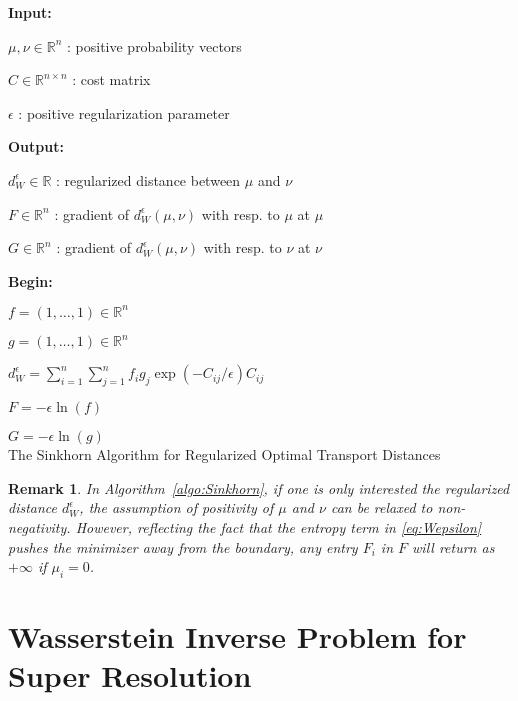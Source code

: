 \documentclass[conference]{IEEEtran}
\newcommand{\R}{{\mathbb{R}}}
\newtheorem*{remark}{Remark}
\begin{document}
\begin{algorithm}
    \textbf{Input:} 
    
    \quad $\mu, \nu \in \R^n$ : positive probability vectors 

    \quad $C\in\R^{n \times n}$ : cost matrix 
    
    \quad $\epsilon$ : positive regularization parameter
    
    \textbf{Output:}
    
    \quad $d_W^\epsilon \in \R$ : regularized distance between $\mu$ and $\nu$
    
    \quad $F \in \R^n$ : gradient of $d_W^\epsilon(\mu,\nu)$ with resp. to $\mu$ at $\mu$
    
    \quad $G \in \R^n$ : gradient of $d_W^\epsilon(\mu,\nu)$ with resp. to $\nu$ at $\nu$ 

    \textbf{Begin:} 

    $f = (1,\ldots,1)\in \R^n$
    
    $g = (1,\ldots,1)\in \R^n$
    
 	{
  	}
  	
    $d_W^\epsilon = \sum_{i=1}^n \sum_{j=1}^n f_i g_j \exp(-C_{ij} /\epsilon) C_{ij}$ 
  	
  	$F = -\epsilon \ln(f)$
  	
  	$G = -\epsilon \ln(g)$\\
  	
	\caption{The Sinkhorn Algorithm for Regularized Optimal Transport Distances}
	\label{algo:Sinkhorn}
\end{algorithm}


\begin{remark}
In Algorithm~\ref{algo:Sinkhorn}, if one is only interested the regularized distance $d_W^\epsilon$, the assumption of positivity of $\mu$ and $\nu$ can be relaxed to non-negativity. 
However, reflecting the fact that the entropy term in \eqref{eq:Wepsilon} pushes the minimizer away from the boundary, any entry $F_i$ in $F$ will return as $+\infty$ if $\mu_i=0$. 
\end{remark}

\section{Wasserstein Inverse Problem for Super Resolution}
\end{document}
